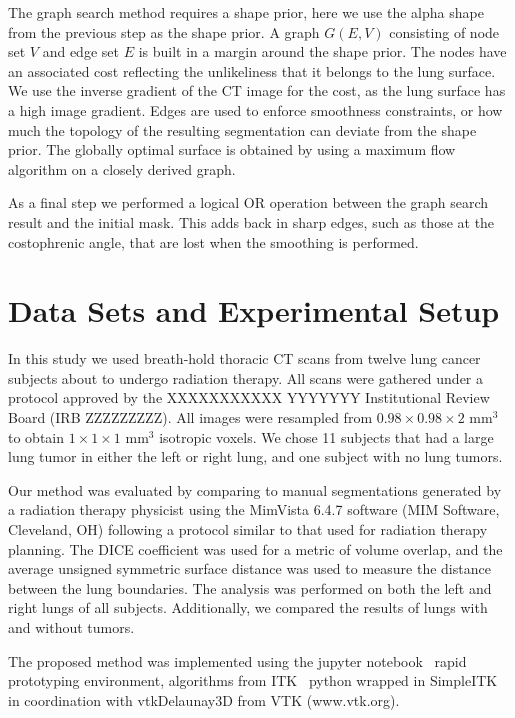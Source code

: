 \documentclass{llncs}
\begin{document}
The graph search method requires a shape prior, here we use the alpha shape from the previous step as the shape prior. A graph $G(E,V)$ consisting of node set $V$ and edge set $E$ is built in a margin around the shape prior. The nodes have an associated cost reflecting the unlikeliness that it belongs to the lung surface. We use the inverse gradient of the CT image for the cost, as the lung surface has a high image gradient. Edges are used to enforce smoothness constraints, or how much the topology of the resulting segmentation can deviate from the shape prior. The globally optimal surface is obtained by using a maximum flow algorithm on a closely derived graph. 

As a final step we performed a logical OR operation between the graph search result and the initial mask. This adds back in sharp edges, such as those at the costophrenic angle, that are lost when the smoothing is performed.
 

%
\section{Data Sets and Experimental Setup}
%
In this study we used breath-hold thoracic CT scans from twelve lung cancer subjects about to undergo radiation therapy. All scans were gathered under a protocol approved by the 
XXXXXXXXXXX YYYYYYY 
Institutional Review Board 
(IRB ZZZZZZZZZ).
All images were resampled from $0.98\times{}0.98\times{}2$ mm$^3$ to obtain $1\times{}1\times{}1$ mm$^3$ isotropic voxels. We chose 11 subjects that had a large lung tumor in either the left or right lung, and one subject with no lung tumors.

Our method was evaluated by comparing to manual segmentations generated by a radiation therapy physicist using the MimVista 6.4.7 software (MIM Software, Cleveland, OH) following a protocol similar to that used for radiation therapy planning. The DICE coefficient was used for a metric of volume overlap, and the average unsigned symmetric surface distance was used to measure the distance between the lung boundaries. The analysis was performed on both the left and right lungs of all subjects. Additionally, we compared the results of lungs with and without tumors.


The proposed method was implemented using the jupyter notebook~\cite{PER-GRA:2007} rapid prototyping environment,  algorithms from ITK~\cite{johnson2015itk} python wrapped in SimpleITK~\cite{10.3389/fninf.2013.00045} in coordination with vtkDelaunay3D from VTK (www.vtk.org).
\end{document}
